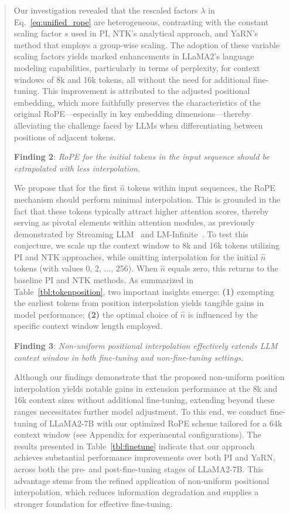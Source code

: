 \begin{abstract}
Our investigation revealed that the rescaled factors $\lambda$ in Eq.~\ref{eq:unified_rope} are heterogeneous, contrasting with the constant scaling factor $s$ used in PI, NTK’s analytical approach, and YaRN’s method that employs a group-wise scaling. The adoption of these variable scaling factors yields marked enhancements in LLaMA2’s language modeling capabilities, particularly in terms of perplexity, for context windows of 8k and 16k tokens, all without the need for additional fine-tuning. This improvement is attributed to the adjusted positional embedding, which more faithfully preserves the characteristics of the original RoPE—especially in key embedding dimensions—thereby alleviating the challenge faced by LLMs when differentiating between positions of adjacent tokens.

\textbf{Finding 2}: \textit{RoPE for the initial tokens in the input sequence should be extrapolated with less interpolation.} 

We propose that for the first $\hat{n}$ tokens within input sequences, the RoPE mechanism should perform minimal interpolation. This is grounded in the fact that these tokens typically attract higher attention scores, thereby serving as pivotal elements within attention modules, as previously demonstrated by Streaming LLM~\cite{streamingllm} and LM-Infinite~\cite{han2023lminfinite}. To test this conjecture, we scale up the context window to 8k and 16k tokens utilizing PI and NTK approaches, while omitting interpolation for the initial  $\hat n$ tokens (with values 0, 2, ..., 256). When $\hat n$ equals zero, this returns to the baseline PI and NTK methods. As summarized in Table~\ref{tbl:tokenposition}, two important insights emerge: \textbf{(1)} exempting the earliest tokens from position interpolation yields tangible gains in model performance; \textbf{(2)} the optimal choice of $\hat n$ is influenced by the specific context window length employed.

\textbf{Finding 3}: \textit{Non-uniform positional interpolation effectively extends LLM context window in both fine-tuning and non-fine-tuning settings.} 

Although our findings demonstrate that the proposed non-uniform position interpolation yields notable gains in extension performance at the 8k and 16k context sizes without additional fine-tuning, extending beyond these ranges necessitates further model adjustment. To this end, we conduct fine-tuning of LLaMA2-7B with our optimized RoPE scheme tailored for a 64k context window (see Appendix for experimental configurations). The results presented in Table~\ref{tbl:finetune} indicate that our approach achieves substantial performance improvements over both PI and YaRN, across both the pre- and post-fine-tuning stages of LLaMA2-7B. This advantage stems from the refined application of non-uniform positional interpolation, which reduces information degradation and supplies a stronger foundation for effective fine-tuning.


\end{abstract}
